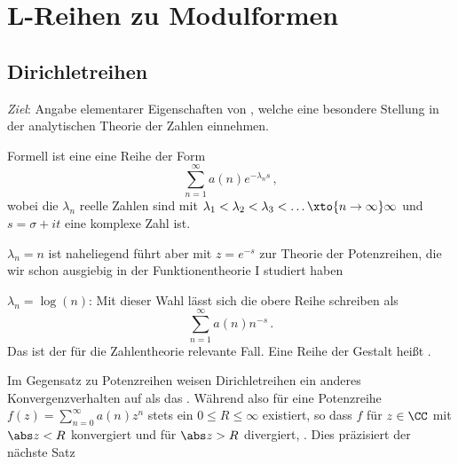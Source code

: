 \chapter{L-Reihen zu Modulformen}

\section{Dirichletreihen}

\emph{Ziel}: Angabe elementarer Eigenschaften von , welche eine besondere Stellung in der analytischen Theorie der Zahlen einnehmen.

\begin{defi}
	Formell ist eine  eine Reihe der Form
	\[
		\sum_{n=1}^{\infty} a(n) e^{-\lambda_n s}
		\,,
	\]
	wobei die $\lambda_n$ reelle Zahlen sind mit $\lambda_1 < \lambda_2 < \lambda_3 < \ldots \xto{n\to\infty} \infty$ und $s= \sigma +it$ eine komplexe Zahl ist.
\end{defi}

\begin{beme-list}
	\item $\lambda_n = n$ ist naheliegend führt aber mit $z = e^{-s}$ zur Theorie der Potenzreihen, die wir schon ausgiebig in der Funktionentheorie I studiert haben
	\item $\lambda_n = \log (n)$: Mit dieser Wahl lässt sich die obere Reihe  schreiben als
	\[\tag{*}
		\sum_{n=1}^\infty a(n) n^{-s}
		\,.
	\]
	Das ist der für die Zahlentheorie relevante Fall.
	Eine Reihe der Gestalt \myref{*} heißt .
	
	\item Im Gegensatz zu Potenzreihen weisen Dirichletreihen ein anderes Konvergenzverhalten auf als das .
	Während also für eine Potenzreihe $f(z) = \sum_{n=0}^\infty a(n) z^n$ stets ein $0 \leq R \leq \infty$ existiert, so dass $f$ für $z \in \CC$ mit $\abs z < R$ konvergiert und für $\abs z > R$ divergiert, .
	Dies präzisiert der nächste Satz
\end{beme-list}


